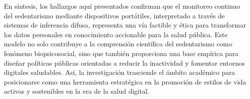 En síntesis, los hallazgos aquí presentados confirman que el monitoreo continuo del sedentarismo mediante dispositivos portátiles, interpretado a través de sistemas de inferencia difusa, representa una vía factible y ética para transformar los datos personales en conocimiento accionable para la salud pública. Este modelo no solo contribuye a la comprensión científica del sedentarismo como fenómeno biopsicosocial, sino que también proporciona una base empírica para diseñar políticas públicas orientadas a reducir la inactividad y fomentar entornos digitales saludables. Así, la investigación trasciende el ámbito académico para posicionarse como una herramienta estratégica en la promoción de estilos de vida activos y sostenibles en la era de la salud digital.


